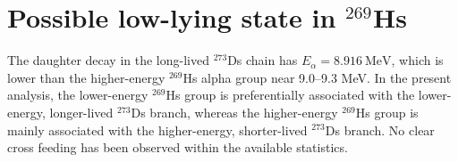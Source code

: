 \documentclass[11pt]{article}
\begin{document}
\FloatBarrier
\section*{Possible low-lying state in $^{269}$Hs}

The daughter decay in the long-lived $^{273}$Ds chain has $E_{\alpha}= 8.916\ \mathrm{MeV}$,
which is lower than the higher-energy $^{269}$Hs alpha group near 9.0--9.3 MeV. In the present analysis, the lower-energy $^{269}$Hs group is preferentially associated with the lower-energy, longer-lived $^{273}$Ds branch, whereas the higher-energy $^{269}$Hs group is mainly associated with the higher-energy, shorter-lived $^{273}$Ds branch. No clear cross feeding has been observed within the available statistics.





\end{document}

